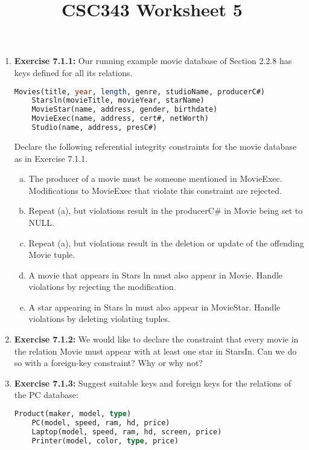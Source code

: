 \documentclass[12pt]{article}
\begin{document}
\title{CSC343 Worksheet 5}
\maketitle

\begin{enumerate}[1.]
    \item \textbf{Exercise 7.1.1:} Our running example movie database of Section
    2.2.8 has keys defined for all its relations.

    \begin{lstlisting}[language=SQL]
    Movies(title, year, length, genre, studioName, producerC#)
    Starsln(movieTitle, movieYear, starName)
    MovieStar(name, address, gender, birthdate)
    MovieExec(name, address, cert#, netWorth)
    Studio(name, address, presC#)
    \end{lstlisting}

    \bigskip

    Declare the following referential integrity constraints for the movie database as
    in Exercise 7.1.1.

    \begin{enumerate}[a)]
        \item The producer of a movie must be someone mentioned in MovieExec. Modifications to MovieExec that violate this constraint are rejected.
        \item Repeat (a), but violations result in the producerC\# in Movie being set to NULL.
        \item Repeat (a), but violations result in the deletion or update of the offending Movie tuple.
        \item A movie that appears in Stars ln must also appear in Movie. Handle violations by rejecting the modification.
        \item A star appearing in Stars ln must also appear in MovieStar. Handle violations by deleting violating tuples.
    \end{enumerate}

    \item \textbf{Exercise 7.1.2:} We would like to declare the constraint that every movie in
    the relation Movie must appear with at least one star in StarsIn. Can we do
    so with a foreign-key constraint? Why or why not?

    \item \textbf{Exercise 7.1.3:} Suggest suitable keys and foreign keys for the relations of the
    PC database:

    \begin{lstlisting}[language=SQL]
    Product(maker, model, type)
    PC(model, speed, ram, hd, price)
    Laptop(model, speed, ram, hd, screen, price)
    Printer(model, color, type, price)
    \end{lstlisting}


\end{enumerate}
\end{document}
